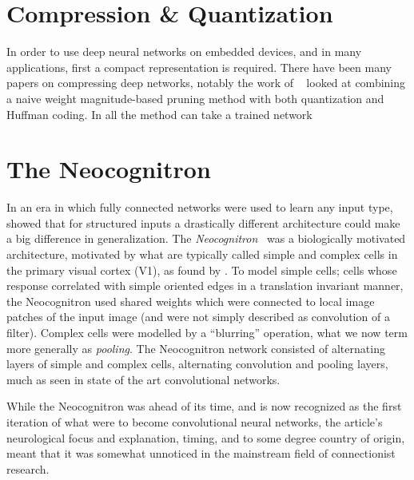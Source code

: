 \documentclass[thesis]{subfiles}
\begin{document}
	\citet{lecun1989optimal,sietsma1988neural,han2015deep,ullrich2017soft,}
    \section{Compression \& Quantization}
    In order to use deep neural networks on embedded devices, and in many applications, first a compact representation is required. There have been many papers on compressing deep networks, notably the work of ~\citep{han2016dsd} looked at combining a naive weight magnitude-based pruning method with both quantization and Huffman coding. In all the method can take a trained network
	
\section{The Neocognitron}
	In an era in which fully connected networks were used to learn any input type, \citet{Fuk80} showed that for structured inputs a drastically different architecture could make a big difference in generalization. The \emph{Neocognitron}~\citep{Fuk80, fukushima2013artificial} was a biologically motivated architecture, motivated by what are typically called simple and complex cells in the primary visual cortex (V1), as found by \citet{Hubel1959a}. To model simple cells; cells whose response correlated with simple oriented edges in a translation invariant manner, the Neocognitron used shared weights which were connected to local image patches of the input image (and were not simply described as convolution of a filter). Complex cells were modelled by a ``blurring'' operation, what we now term more generally as \emph{pooling}. The Neocognitron network consisted of alternating layers of simple and complex cells, \ie alternating convolution and pooling layers, much as seen in state of the art convolutional networks.

	While the Neocognitron was ahead of its time, and is now recognized as the first iteration of what were to become convolutional neural networks, the article's neurological focus and explanation, timing, and to some degree country of origin, meant that it was somewhat unnoticed in the mainstream field of connectionist research. %
	
\end{document}
